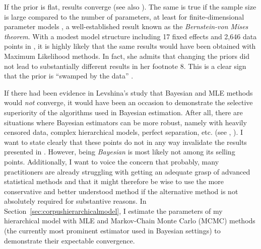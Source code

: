 \documentclass[USenglish]{article}
\begin{document}
If the prior is flat, results converge (see also \citealp[347]{GelmanHill2006}).
The same is true if the sample size is large compared to the number of parameters, at least for finite-dimensional parameter models \citep[1119--1120]{Freedman1999}, a well-established result known as the \textit{Bernstein-von Mises theorem}.
With a modest model structure including 17 fixed effects and 2,646 data points in \cite{Levshina2016}, it is highly likely that the same results would have been obtained with Maximum Likelihood methods.
In fact, she admits that changing the priors did not lead to substantially different results in her footnote 8.
This is a clear sign that the prior is ``swamped by the data'' \citep[1119]{Freedman1999}.

If there had been evidence in Levshina's study that Bayesian and MLE methods would \textit{not} converge, it would have been an occasion to demonstrate the selective superiority of the algorithms used in Bayesian estimation.
After all, there are situations where Bayesian estimators can be more robust, namely with heavily censored data, complex hierarchical models, perfect separation, etc. (see \citealp{Freedman1999}, \citealp[345--348]{GelmanHill2006}).
I want to state clearly that these points do not in any way invalidate the results presented in \cite{Levshina2016}.
However, being \textit{Bayesian} is most likely not among its selling points.
Additionally, I want to voice the concern that probably, many practitioners are already struggling with getting an adequate grasp of advanced statistical methods and that it might therefore be wise to use the more conservative and better understood method if the alternative method is not absolutely required for substantive reasons.
In Section~\ref{sec:corpushierarchicalmodel}, I estimate the parameters of my hierarchical model with MLE and Markov-Chain Monte Carlo (MCMC) methods (the currently most prominent estimator used in Bayesian settings) to demonstrate their expectable convergence.


\end{document}
